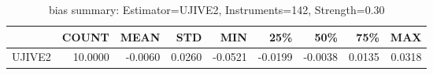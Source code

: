 \begin{table}[ht]
\centering
\caption{bias summary: Estimator=UJIVE2, Instruments=142, Strength=0.30}
\begin{tabular}{lrrrrrrrr}
\toprule
 & COUNT & MEAN & STD & MIN & 25\% & 50\% & 75\% & MAX \\
\midrule
UJIVE2 & 10.0000 & -0.0060 & 0.0260 & -0.0521 & -0.0199 & -0.0038 & 0.0135 & 0.0318 \\
\bottomrule
\end{tabular}
\end{table}
